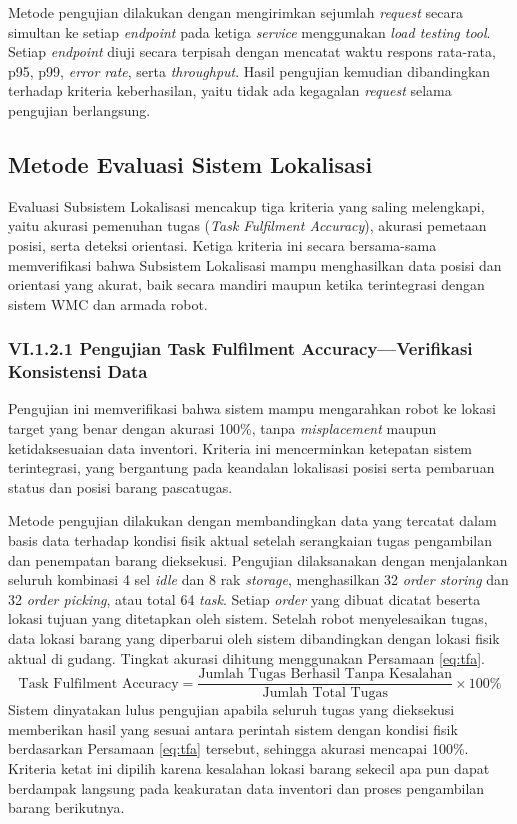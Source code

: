 Metode pengujian dilakukan dengan mengirimkan sejumlah \textit{request} secara simultan ke setiap \textit{endpoint} pada ketiga \textit{service} menggunakan \textit{load testing tool}. Setiap \textit{endpoint} diuji secara terpisah dengan mencatat waktu respons rata-rata, p95, p99, \textit{error rate}, serta \textit{throughput}. Hasil pengujian kemudian dibandingkan terhadap kriteria keberhasilan, yaitu tidak ada kegagalan \textit{request} selama pengujian berlangsung.

\subsection{Metode Evaluasi Sistem Lokalisasi}
Evaluasi Subsistem Lokalisasi mencakup tiga kriteria yang saling melengkapi, yaitu akurasi pemenuhan tugas (\textit{Task Fulfilment Accuracy}), akurasi pemetaan posisi, serta deteksi orientasi. Ketiga kriteria ini secara bersama-sama memverifikasi bahwa Subsistem Lokalisasi mampu menghasilkan data posisi dan orientasi yang akurat, baik secara mandiri maupun ketika terintegrasi dengan sistem WMC dan armada robot.

\subsubsection*{VI.1.2.1 Pengujian Task Fulfilment Accuracy---Verifikasi Konsistensi Data}
Pengujian ini memverifikasi bahwa sistem mampu mengarahkan robot ke lokasi target yang benar dengan akurasi 100\%, tanpa \textit{misplacement} maupun ketidaksesuaian data inventori. Kriteria ini mencerminkan ketepatan sistem terintegrasi, yang bergantung pada keandalan lokalisasi posisi serta pembaruan status dan posisi barang pascatugas.

Metode pengujian dilakukan dengan membandingkan data yang tercatat dalam basis data terhadap kondisi fisik aktual setelah serangkaian tugas pengambilan dan penempatan barang dieksekusi. Pengujian dilaksanakan dengan menjalankan seluruh kombinasi 4 sel \textit{idle} dan 8 rak \textit{storage}, menghasilkan 32 \textit{order storing} dan 32 \textit{order picking}, atau total 64 \textit{task}. Setiap \textit{order} yang dibuat dicatat beserta lokasi tujuan yang ditetapkan oleh sistem. Setelah robot menyelesaikan tugas, data lokasi barang yang diperbarui oleh sistem dibandingkan dengan lokasi fisik aktual di gudang. Tingkat akurasi dihitung menggunakan Persamaan \ref{eq:tfa}.
\begin{equation}
\text{Task Fulfilment Accuracy} = \frac{\text{Jumlah Tugas Berhasil Tanpa Kesalahan}}{\text{Jumlah Total Tugas}} \times 100\%
\label{eq:tfa}
\end{equation}
Sistem dinyatakan lulus pengujian apabila seluruh tugas yang dieksekusi memberikan hasil yang sesuai antara perintah sistem dengan kondisi fisik berdasarkan Persamaan \ref{eq:tfa} tersebut, sehingga akurasi mencapai 100\%. Kriteria ketat ini dipilih karena kesalahan lokasi barang sekecil apa pun dapat berdampak langsung pada keakuratan data inventori dan proses pengambilan barang berikutnya.

